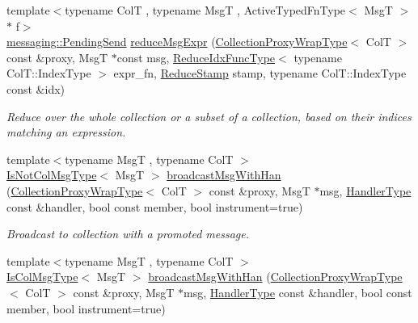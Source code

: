 \begin{DoxyCompactItemize}
{\footnotesize template$<$typename ColT , typename MsgT , Active\+Typed\+Fn\+Type$<$ Msg\+T $>$ $\ast$ f$>$ }\\\hyperlink{structvt_1_1messaging_1_1_pending_send}{messaging\+::\+Pending\+Send} \hyperlink{structvt_1_1vrt_1_1collection_1_1_collection_manager_ae05bc119a4986a39e957c1f8e93eb079}{reduce\+Msg\+Expr} (\hyperlink{structvt_1_1vrt_1_1collection_1_1_collection_manager_a56458ed7f9bb22b631b9b3a745f42f94}{Collection\+Proxy\+Wrap\+Type}$<$ ColT $>$ const \&proxy, MsgT $\ast$const msg, \hyperlink{structvt_1_1vrt_1_1collection_1_1_collection_manager_a47a3227ae0195c15187e8dc8762f66c4}{Reduce\+Idx\+Func\+Type}$<$ typename Col\+T\+::\+Index\+Type $>$ expr\+\_\+fn, \hyperlink{structvt_1_1vrt_1_1collection_1_1_collection_manager_ae8aac19e0ae07e9225142e5880eac830}{Reduce\+Stamp} stamp, typename Col\+T\+::\+Index\+Type const \&idx)
\begin{DoxyCompactList}\small\item\em Reduce over the whole collection or a subset of a collection, based on their indices matching an expression. \end{DoxyCompactList}\item 
{\footnotesize template$<$typename MsgT , typename ColT $>$ }\\\hyperlink{structvt_1_1vrt_1_1collection_1_1_collection_manager_ae376deeefd4f89a0b1c93849977715d9}{Is\+Not\+Col\+Msg\+Type}$<$ MsgT $>$ \hyperlink{structvt_1_1vrt_1_1collection_1_1_collection_manager_aa4f27486773ea5bec481099223ab12d1}{broadcast\+Msg\+With\+Han} (\hyperlink{structvt_1_1vrt_1_1collection_1_1_collection_manager_a56458ed7f9bb22b631b9b3a745f42f94}{Collection\+Proxy\+Wrap\+Type}$<$ ColT $>$ const \&proxy, MsgT $\ast$msg, \hyperlink{namespacevt_af64846b57dfcaf104da3ef6967917573}{Handler\+Type} const \&handler, bool const member, bool instrument=true)
\begin{DoxyCompactList}\small\item\em Broadcast to collection with a promoted message. \end{DoxyCompactList}\item 
{\footnotesize template$<$typename MsgT , typename ColT $>$ }\\\hyperlink{structvt_1_1vrt_1_1collection_1_1_collection_manager_a21c21612c806016788057aeab142af20}{Is\+Col\+Msg\+Type}$<$ MsgT $>$ \hyperlink{structvt_1_1vrt_1_1collection_1_1_collection_manager_a737913f12b46ddaacf64a699c56c1787}{broadcast\+Msg\+With\+Han} (\hyperlink{structvt_1_1vrt_1_1collection_1_1_collection_manager_a56458ed7f9bb22b631b9b3a745f42f94}{Collection\+Proxy\+Wrap\+Type}$<$ ColT $>$ const \&proxy, MsgT $\ast$msg, \hyperlink{namespacevt_af64846b57dfcaf104da3ef6967917573}{Handler\+Type} const \&handler, bool const member, bool instrument=true)

\end{DoxyCompactItemize}
